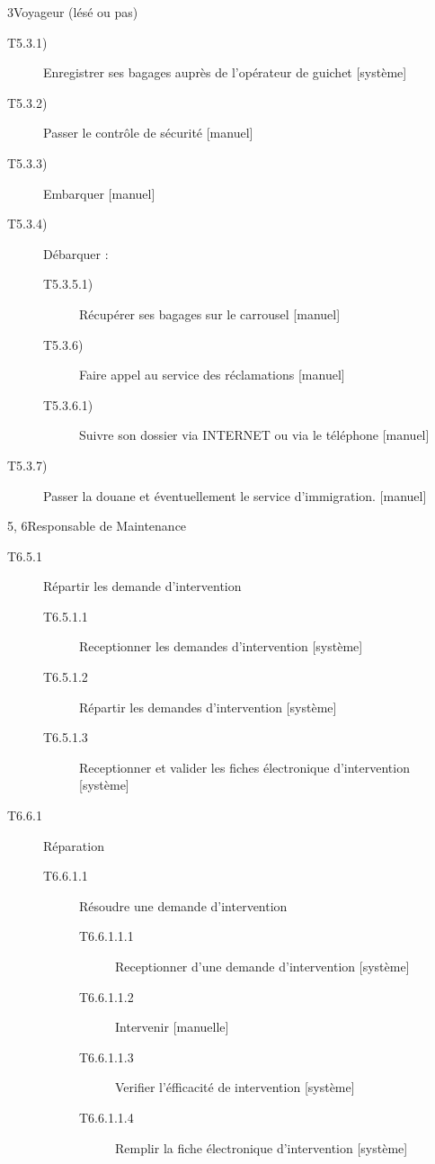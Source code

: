 \dta
{3}{Voyageur (lésé ou pas)}
{}
{
\begin{description}
	\item [T5.3.1)] Enregistrer ses bagages auprès de l'opérateur de guichet [système]
	\item [T5.3.2)] Passer le contrôle de sécurité [manuel]
	\item [T5.3.3)] Embarquer [manuel]
	\item [T5.3.4)] Débarquer : 
	\begin{description}
		\item [T5.3.5.1)] Récupérer ses bagages sur le carrousel [manuel]
		\item [T5.3.6)] Faire appel au service des réclamations [manuel]
		\item [T5.3.6.1)] Suivre son dossier via INTERNET ou via le téléphone [manuel]
	\end{description}
	\item [T5.3.7)] Passer la douane et éventuellement le service d'immigration. [manuel]
\end{description}
}

\dta
{5, 6}{Responsable de Maintenance}{}
{
\begin{description}
	\item[T6.5.1] Répartir les demande d'intervention 
	\begin{description}
		\item[T6.5.1.1] Receptionner les demandes d'intervention [système]
		\item[T6.5.1.2] Répartir les demandes d'intervention [système]
		\item[T6.5.1.3] Receptionner et valider les fiches électronique d'intervention [système]
	\end{description}
	\item[T6.6.1] Réparation 
	\begin{description}
		\item[T6.6.1.1] Résoudre une demande d'intervention 
		\begin{description}
			\item[T6.6.1.1.1] Receptionner d'une demande d'intervention [système]
			\item[T6.6.1.1.2] Intervenir [manuelle]
			\item[T6.6.1.1.3] Verifier l'éfficacité de intervention [système]
			\item[T6.6.1.1.4] Remplir la fiche électronique d'intervention [système]
		\end{description}
	\end{description}
\end{description}
}

